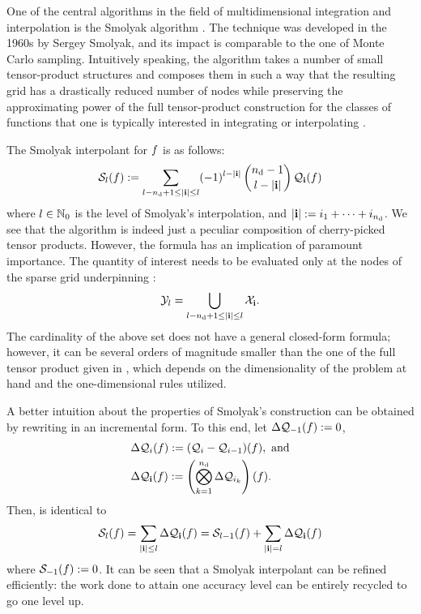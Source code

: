 One of the central algorithms in the field of multidimensional integration and
interpolation is the Smolyak algorithm \cite{smolyak1963}. The technique was
developed in the 1960s by Sergey Smolyak, and its impact is comparable to the
one of Monte Carlo sampling. Intuitively speaking, the algorithm takes a number
of small tensor-product structures and composes them in such a way that the
resulting grid has a drastically reduced number of nodes while preserving the
approximating power of the full tensor-product construction for the classes of
functions that one is typically interested in integrating or interpolating
\cite{klimke2006}.

The Smolyak interpolant for $f$ is as follows:
\begin{equation} \elab{smolyak}
  \smolyak{\l}(\f) := \sum_{\l - \nin + 1 \leq |\vi| \leq \l} (-1)^{\l - |\vi|} \, {\nin - 1 \choose \l - |\vi|} \, \tensor{\vi}(\f)
\end{equation}
where $l \in \mathbb{N}_0$ is the level of Smolyak's interpolation, and $|\mathbf{i}| :=
i_1 + \dots + i_{n_\text{d}}$. We see that the algorithm is indeed just a peculiar
composition of cherry-picked tensor products. However, the formula has an
implication of paramount importance. The quantity of interest needs to be
evaluated only at the nodes of the sparse grid underpinning :
\begin{equation} \elab{smolyak-grid}
  \Y_l = \bigcup_{\l - \nin + 1 \leq |\vi| \leq \l} \X_\vi.
\end{equation}
The cardinality of the above set does not have a general closed-form formula;
however, it can be several orders of magnitude smaller than the one of the full
tensor product given in , which depends on the
dimensionality of the problem at hand and the one-dimensional rules utilized.

A better intuition about the properties of Smolyak's construction can be
obtained by rewriting  in an incremental form. To this end, let
$\Delta\mathcal{Q}_{-1}(f) := 0$,
\begin{align}
  & \Delta\tensor{i}(\f) := (\tensor{i} - \tensor{i - 1})(\f), \text{ and} \elab{tensor-delta-1d} \\
  & \Delta\tensor{\vi}(\f) := \left( \bigotimes_{k = 1}^\nin \Delta\tensor{i_k} \right)(\f). \nonumber
\end{align}
Then,  is identical to
\begin{equation} \elab{smolyak-incremental}
  \smolyak{\l}(\f) = \sum_{|\vi| \leq \l} \Delta\tensor{\vi}(\f) = \smolyak{\l - 1}(\f) + \sum_{|\vi| = \l} \Delta\tensor{\vi}(\f)
\end{equation}
where $\mathcal{S}_{-1}(f) := 0$. It can be seen that a Smolyak interpolant can be
refined efficiently: the work done to attain one accuracy level can be entirely
recycled to go one level up.

